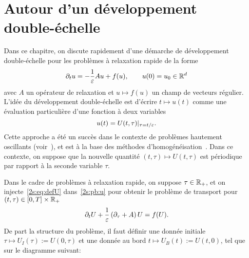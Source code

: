 \chapter{Autour d'un développement double-échelle}
\label{chap:two-scale}

Dans ce chapitre, on discute rapidement d'une démarche de développement double-échelle pour les problèmes à relaxation rapide de la forme
\begin{equation} \label{2s:pb:u}
    \partial_t u = -\frac{1}{\varepsilon}Au + f(u), 
    \qquad
    u(0) = u_0 \in \mathbb{R}^d
\end{equation}
avec $A$ un opérateur de relaxation et $u \mapsto f(u)$ un champ de vecteurs régulier. L'idée du développement double-échelle est d'écrire $t \mapsto u(t)$ comme une évaluation particulière d'une fonction à deux variables 
\begin{equation} \label{2s:eq:defU}
    u(t) = U(t,\tau)|_{\tau = t/\varepsilon} .
\end{equation}
Cette approche a été un succès dans le contexte de problèmes hautement oscillants (voir~\cite{chartier.2015.uniformly, chartier.2020.derivative}), et est à la base des méthodes d'homogénéisation~\cite{allaire.1992.homogenization}. Dans ce contexte, on suppose que la nouvelle quantité $(t,\tau) \mapsto U(t,\tau)$ est périodique par rapport à la seconde variable $\tau$. 

Dans le cadre de problèmes à relaxation rapide, on suppose $\tau \in \mathbb{R}_+$, et on injecte~\eqref{2s:eq:defU} dans~\eqref{2s:pb:u} pour obtenir le problème de transport pour $(t,\tau) \in [0,T] \times \mathbb{R}_+$ 
\begin{equation} \label{2s:pb:trsp_U}
    \partial_t U + \frac{1}{\varepsilon} \left(\partial_\tau + A \right) U
    = f(U) .
\end{equation}
De part la structure du problème, il faut définir une donnée initiale $\tau \mapsto U_I(\tau) := U(0,\tau)$ et une donnée au bord $t \mapsto U_B(t) := U(t,0)$, tel que sur le diagramme suivant: 

